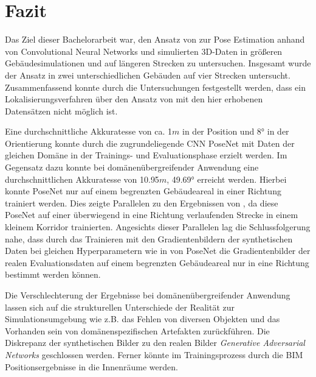 
\section{Fazit}
\label{sec:kapitel_6}
Das Ziel dieser Bachelorarbeit war, den Ansatz von \citet{acharyaBIMPoseNetIndoorCamera2019} zur Pose Estimation anhand von Convolutional Neural Networks und simulierten 3D-Daten in größeren Gebäudesimulationen und auf längeren Strecken zu untersuchen.
Insgesamt wurde der Ansatz in zwei unterschiedlichen Gebäuden auf vier Strecken untersucht. Zusammenfassend konnte durch die Untersuchungen festgestellt werden, dass ein Lokalisierungsverfahren über den Ansatz von \citet{acharyaBIMPoseNetIndoorCamera2019} mit den hier erhobenen Datensätzen nicht möglich ist.


Eine durchschnittliche Akkuratesse von ca. 1$m$ in der Position und 8° in der Orientierung konnte durch die zugrundeliegende CNN PoseNet mit Daten der gleichen Domäne in der Trainings- und Evaluationsphase erzielt werden. Im Gegensatz dazu konnte bei domänenübergreifender Anwendung eine durchschnittlichen Akkuratesse von 10.95$m$, 49.69° erreicht werden. Hierbei konnte PoseNet nur auf einem begrenzten Gebäudeareal in einer Richtung trainiert werden. Dies zeigte Parallelen zu den Ergebnissen von \citet{acharyaBIMPoseNetIndoorCamera2019}, da diese PoseNet auf einer überwiegend in eine Richtung verlaufenden Strecke in einem kleinem Korridor trainierten. Angesichts dieser Parallelen lag die Schlussfolgerung nahe, dass durch das Trainieren mit den Gradientenbildern der synthetischen Daten bei gleichen Hyperparametern wie in \cite{acharyaBIMPoseNetIndoorCamera2019} von PoseNet die Gradientenbilder der realen Evaluationsdaten auf einem begrenzten Gebäudeareal nur in eine Richtung bestimmt werden können.



Die Verschlechterung der Ergebnisse bei domänenübergreifender Anwendung lassen sich auf die strukturellen Unterschiede der Realität zur Simulationsumgebung wie z.B. das Fehlen von diversen Objekten und das Vorhanden sein von domänenspezifischen Artefakten zurückführen. Die Diskrepanz der synthetischen Bilder zu den realen Bilder \textit{Generative Adversarial Networks} geschlossen werden. Ferner könnte im Trainingsprozess durch die BIM Positionsergebnisse in die Innenräume werden. 

